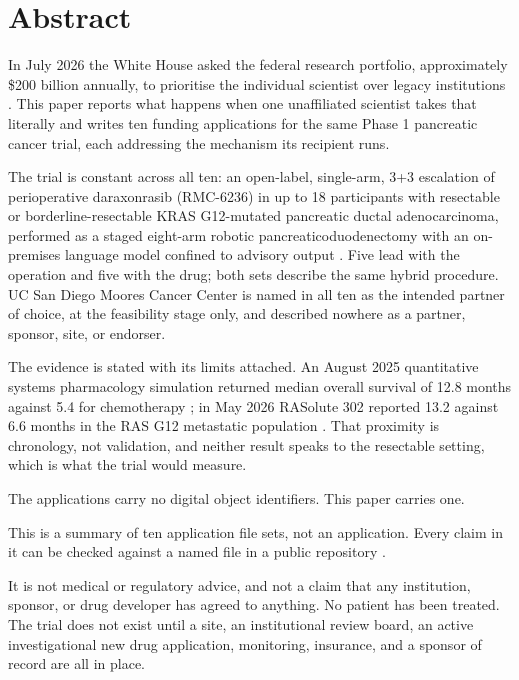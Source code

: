 \section*{Abstract}

In July 2026 the White House asked the federal research portfolio, approximately
\$200 billion annually, to prioritise the individual scientist over legacy
institutions \cite{kratsios2026sciencegoldenage}. This paper reports what happens
when one unaffiliated scientist takes that literally and writes ten funding
applications for the same Phase 1 pancreatic cancer trial, each addressing the
mechanism its recipient runs.

The trial is constant across all ten: an open-label, single-arm, 3+3 escalation
of perioperative daraxonrasib (RMC-6236) in up to 18 participants with
resectable or borderline-resectable KRAS G12-mutated pancreatic ductal
adenocarcinoma, performed as a staged eight-arm robotic pancreaticoduodenectomy
with an on-premises language model confined to advisory output
\cite{onpremwhippl,phase1ind}. Five lead with the operation and five with the
drug; both sets describe the same hybrid procedure. UC San Diego Moores Cancer
Center is named in all ten as the intended partner of choice, at the feasibility
stage only, and described nowhere as a partner, sponsor, site, or endorser.

The evidence is stated with its limits attached. An August 2025 quantitative
systems pharmacology simulation returned median overall survival of 12.8 months
against 5.4 for chemotherapy \cite{qspmetpancre}; in May 2026 RASolute 302
reported 13.2 against 6.6 months in the RAS G12 metastatic population
\cite{rasolute302}. That proximity is chronology, not validation, and neither
result speaks to the resectable setting, which is what the trial would measure.

The applications carry no digital object identifiers. This paper carries one.


This is a summary of ten application file sets, not an application. Every claim
in it can be checked against a named file in a public repository
\cite{repo2026}.

It is not medical or regulatory advice, and not a claim that any institution,
sponsor, or drug developer has agreed to anything. No patient has been treated.
The trial does not exist until a site, an institutional review board, an active
investigational new drug application, monitoring, insurance, and a sponsor of
record are all in place.

